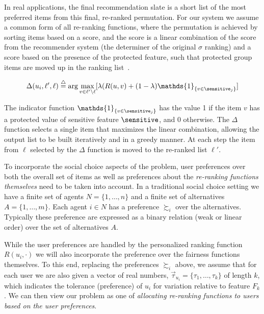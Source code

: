 In real applications, the final recommendation slate is a short list of the most preferred items from this final, re-ranked permutation. For our system we assume a common form of all re-ranking functions, where the permutation is achieved by sorting items based on a score, and the score is a linear combination of the score from the recommender system (the determiner of the original $\sigma$ ranking) and a score based on the presence of the protected feature, such that protected group items are moved up in the ranking list~\cite{adomavicius2009improving}. 


\begin{equation}
    \Delta(u_i,\ell',\ell)\buildrel\triangle\over= \arg\max_{v \in \ell' \setminus \ell} [\lambda  (R(u,v) + (1 - \lambda) \mathds{1}_{\{v \in \sensitive_j\}}]
\label{eq:reranker}
\end{equation}

The indicator function $\mathds{1}_{\{v \in \sensitive_j\}}$ has the value 1 if the item $v$ has a protected value of sensitive feature $\sensitive$, and 0 otherwise. The $\Delta$ function selects a single item that maximizes the linear combination, allowing the output list to be built iteratively and in a greedy manner. At each step the item from $\ell$ selected by the $\Delta$ function is moved to the re-ranked list $\ell'$.


To incorporate the social choice aspects of the problem, user preferences over both the overall set of items as well as preferences about the \emph{re-ranking functions themselves} need to be taken into account. In a traditional social choice setting we have a finite set of agents $N = \{1, \ldots, n\}$ and a finite set of alternatives $A = \{1, \ldots, m\}$. Each agent $i \in N$ has a preference $\succsim_i$ over the alternatives. Typically these preference are expressed as a binary relation (weak or linear order) over the set of alternatives $A$.  

While the user preferences are handled by the personalized ranking function $R(u_i, \cdot)$ we will also incorporate the preference over the fairness functions themselves. To this end, replacing the preferences $\succsim_i$ above, we assume that for each user we are also given a vector of real numbers, $\vec{\tau}_{u_i} = \{\tau_1, \ldots, \tau_k\}$ of length $k$, which indicates the tolerance (preference) of $u_i$ for variation relative to feature $F_k$.  We can then view our problem as one of \emph{allocating re-ranking functions to users based on the user preferences}.

